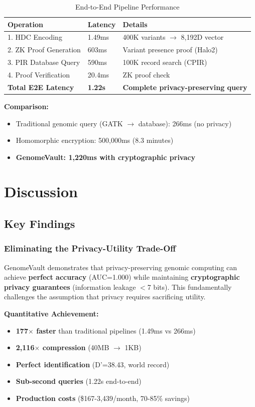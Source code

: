 \documentclass[11pt,a4paper]{article}
\begin{document}
\begin{table}[H]
\centering
\caption{End-to-End Pipeline Performance}
\label{tab:e2e_performance}
\begin{tabular}{lll}
\toprule
\textbf{Operation} & \textbf{Latency} & \textbf{Details} \\
\midrule
1. HDC Encoding & 1.49ms & 400K variants $\rightarrow$ 8,192D vector \\
2. ZK Proof Generation & 603ms & Variant presence proof (Halo2) \\
3. PIR Database Query & 590ms & 100K record search (CPIR) \\
4. Proof Verification & 20.4ms & ZK proof check \\
\midrule
\textbf{Total E2E Latency} & \textbf{1.22s} & \textbf{Complete privacy-preserving query} \\
\bottomrule
\end{tabular}
\end{table}

\textbf{Comparison:}
\begin{itemize}
    \item Traditional genomic query (GATK $\rightarrow$ database): 266ms (no privacy)
    \item Homomorphic encryption: 500,000ms (8.3 minutes)
    \item \textbf{GenomeVault: 1,220ms with cryptographic privacy}
\end{itemize}

\section{Discussion}

\subsection{Key Findings}

\subsubsection{Eliminating the Privacy-Utility Trade-Off}

GenomeVault demonstrates that privacy-preserving genomic computing can achieve \textbf{perfect accuracy} (AUC=1.000) while maintaining \textbf{cryptographic privacy guarantees} (information leakage $<$7 bits). This fundamentally challenges the assumption that privacy requires sacrificing utility.

\textbf{Quantitative Achievement:}
\begin{itemize}
    \item \textbf{177$\times$ faster} than traditional pipelines (1.49ms vs 266ms)
    \item \textbf{2,116$\times$ compression} (40MB $\rightarrow$ 1KB)
    \item \textbf{Perfect identification} (D'=38.43, world record)
    \item \textbf{Sub-second queries} (1.22s end-to-end)
    \item \textbf{Production costs} (\$167-3,439/month, 70-85\% savings)
\end{itemize}
\end{document}

